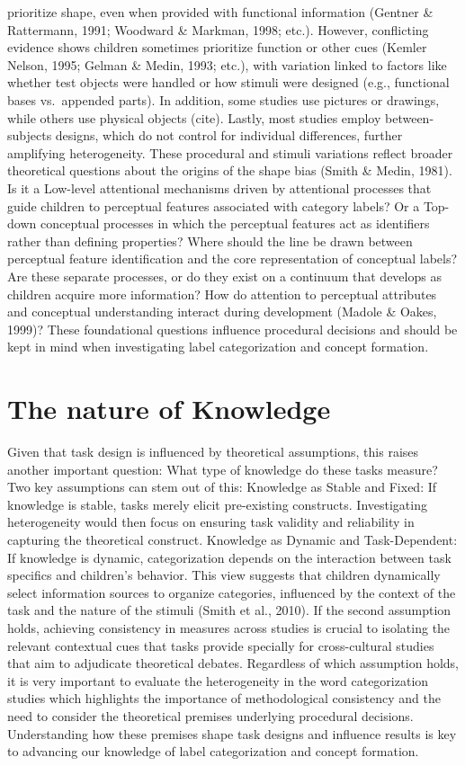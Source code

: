 \documentclass[10pt, letterpaper]{article}
\begin{document}
prioritize shape, even when provided with functional information
(Gentner \& Rattermann, 1991; Woodward \& Markman, 1998; etc.). However,
conflicting evidence shows children sometimes prioritize function or
other cues (Kemler Nelson, 1995; Gelman \& Medin, 1993; etc.), with
variation linked to factors like whether test objects were handled or
how stimuli were designed (e.g., functional bases vs.~appended parts).
In addition, some studies use pictures or drawings, while others use
physical objects (cite). Lastly, most studies employ between-subjects
designs, which do not control for individual differences, further
amplifying heterogeneity. These procedural and stimuli variations
reflect broader theoretical questions about the origins of the shape
bias (Smith \& Medin, 1981). Is it a Low-level attentional mechanisms
driven by attentional processes that guide children to perceptual
features associated with category labels? Or a Top-down conceptual
processes in which the perceptual features act as identifiers rather
than defining properties? Where should the line be drawn between
perceptual feature identification and the core representation of
conceptual labels? Are these separate processes, or do they exist on a
continuum that develops as children acquire more information? How do
attention to perceptual attributes and conceptual understanding interact
during development (Madole \& Oakes, 1999)? These foundational questions
influence procedural decisions and should be kept in mind when
investigating label categorization and concept formation.

\hypertarget{the-nature-of-knowledge}{%
\section{The nature of Knowledge}\label{the-nature-of-knowledge}}

Given that task design is influenced by theoretical assumptions, this
raises another important question: What type of knowledge do these tasks
measure? Two key assumptions can stem out of this: Knowledge as Stable
and Fixed: If knowledge is stable, tasks merely elicit pre-existing
constructs. Investigating heterogeneity would then focus on ensuring
task validity and reliability in capturing the theoretical construct.
Knowledge as Dynamic and Task-Dependent: If knowledge is dynamic,
categorization depends on the interaction between task specifics and
children's behavior. This view suggests that children dynamically select
information sources to organize categories, influenced by the context of
the task and the nature of the stimuli (Smith et al., 2010). If the
second assumption holds, achieving consistency in measures across
studies is crucial to isolating the relevant contextual cues that tasks
provide specially for cross-cultural studies that aim to adjudicate
theoretical debates. Regardless of which assumption holds, it is very
important to evaluate the heterogeneity in the word categorization
studies which highlights the importance of methodological consistency
and the need to consider the theoretical premises underlying procedural
decisions. Understanding how these premises shape task designs and
influence results is key to advancing our knowledge of label
categorization and concept formation.
\end{document}
